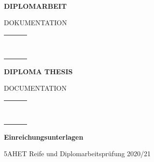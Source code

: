 
\newpage
\thispagestyle{empty}
\mbox{}
\newpage


\centering
\begin{huge}
\textbf{DIPLOMARBEIT}
\end{huge}

\begin{large}
DOKUMENTATION
\end{large}

\begin{tabular}{|l|l|l|}
\hline
 &  &  \\ \hline
 &  &  \\ \hline
 &  &  \\ \hline
 &  &  \\ \hline
 &  &  \\ \hline
 &  &  \\ \hline
 &  &  \\ \hline
 &  &  \\ \hline
 &  &  \\ \hline
\end{tabular}


\newpage
\centering
\begin{huge}
\textbf{DIPLOMA THESIS}
\end{huge}

\begin{large}
DOCUMENTATION
\end{large}

\begin{tabular}{|l|l|l|}
\hline
 &  &  \\ \hline
 &  &  \\ \hline
 &  &  \\ \hline
 &  &  \\ \hline
 &  &  \\ \hline
 &  &  \\ \hline
 &  &  \\ \hline
 &  &  \\ \hline
 &  &  \\ \hline
\end{tabular}


\newpage
\begin{huge}
\textbf{Einreichungsunterlagen}
\end{huge}

\bigskip
\begin{large}
5AHET Reife und Diplomarbeitsprüfung 2020/21
\end{large}

